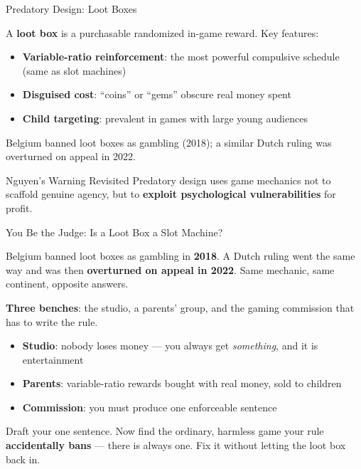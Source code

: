 \documentclass[aspectratio=169,11pt]{beamer}
\begin{document}
\begin{frame}[t]{Predatory Design: Loot Boxes}
\begin{casestudybox}
\footnotesize
A \textbf{loot box} is a purchasable randomized in-game reward. Key features:
\begin{itemize}
    \item \textbf{Variable-ratio reinforcement}: the most powerful compulsive schedule (same as slot machines)
    \item \textbf{Disguised cost}: ``coins'' or ``gems'' obscure real money spent
    \item \textbf{Child targeting}: prevalent in games with large young audiences
\end{itemize}
Belgium banned loot boxes as gambling (2018); a similar Dutch ruling was overturned on appeal in 2022.
\end{casestudybox}

\vspace{0.1cm}
\begin{alertblock}{Nguyen's Warning Revisited}
\footnotesize
Predatory design uses game mechanics not to scaffold genuine agency, but to \textbf{exploit psychological vulnerabilities} for profit.
\end{alertblock}
\end{frame}
\begin{frame}[shrink=8]{You Be the Judge: Is a Loot Box a Slot Machine?}
\begin{casestudybox}
\small
Belgium banned loot boxes as gambling in \textbf{2018}. A Dutch ruling went the same way and was then \textbf{overturned on appeal in 2022}. Same mechanic, same continent, opposite answers.
\end{casestudybox}

\textbf{Three benches}: the studio, a parents' group, and the gaming commission that has to write the rule.
\begin{itemize}
    \item \textbf{Studio}: nobody loses money --- you always get \emph{something}, and it is entertainment
    \item \textbf{Parents}: variable-ratio rewards bought with real money, sold to children
    \item \textbf{Commission}: you must produce one enforceable sentence
\end{itemize}

\begin{discussionbox}
Draft your one sentence. Now find the ordinary, harmless game your rule \textbf{accidentally bans} --- there is always one. Fix it without letting the loot box back in.
\end{discussionbox}
\end{frame}
\end{document}
